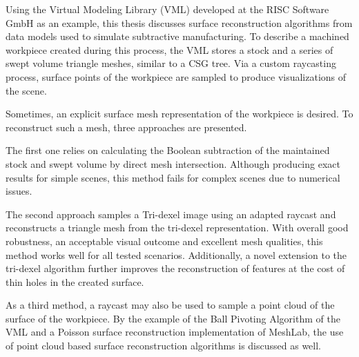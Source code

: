 Using the Virtual Modeling Library (VML) developed at the RISC Software GmbH as an example, this thesis discusses surface reconstruction algorithms from data models used to simulate subtractive manufacturing.
To describe a machined workpiece created during this process, the VML stores a stock and a series of swept volume triangle meshes, similar to a CSG tree.
Via a custom raycasting process, surface points of the workpiece are sampled to produce visualizations of the scene.

Sometimes, an explicit surface mesh representation of the workpiece is desired.
To reconstruct such a mesh, three approaches are presented.

The first one relies on calculating the Boolean subtraction of the maintained stock and swept volume by direct mesh intersection.
Although producing exact results for simple scenes, this method fails for complex scenes due to numerical issues.

The second approach samples a Tri-dexel image using an adapted raycast and reconstructs a triangle mesh from the tri-dexel representation.
With overall good robustness, an acceptable visual outcome and excellent mesh qualities, this method works well for all tested scenarios.
Additionally, a novel extension to the tri-dexel algorithm further improves the reconstruction of features at the cost of thin holes in the created surface.

As a third method, a raycast may also be used to sample a point cloud of the surface of the workpiece.
By the example of the Ball Pivoting Algorithm of the VML and a Poisson surface reconstruction implementation of MeshLab, the use of point cloud based surface reconstruction algorithms is discussed as well.

